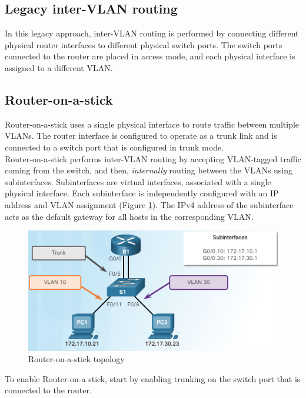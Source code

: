 \subsection{Legacy inter-VLAN routing}

In this legacy approach, inter-VLAN routing is performed by connecting different physical router interfaces to different physical switch ports. The switch ports connected to the router are placed in access mode, and each physical interface is assigned to a different VLAN.

\subsection{Router-on-a-stick}

Router-on-a-stick uses a single physical interface to route traffic between multiple VLANs. The router interface is configured to operate as a trunk link and is connected to a switch port that is configured in trunk mode. \\

Router-on-a-stick performs inter-VLAN routing by accepting VLAN-tagged traffic coming from the switch, and then, \emph{internally} routing between the VLANs using subinterfaces. Subinterfaces are virtual interfaces, associated with a single physical interface. Each subinterface is independently configured with an IP address and VLAN assignment (Figure \ref{InterVLAN}). The IPv4 address of the subinterface acts as the default gateway for all hosts in the corresponding VLAN.\\

\begin{figure}[hbtp]
\caption{Router-on-a-stick topology}\label{InterVLAN}
\centering
\includegraphics[scale=1]{pictures/InterVLAN.PNG}
\end{figure}


To enable Router-on-a stick, start by enabling trunking on the switch port that is connected to the router.

